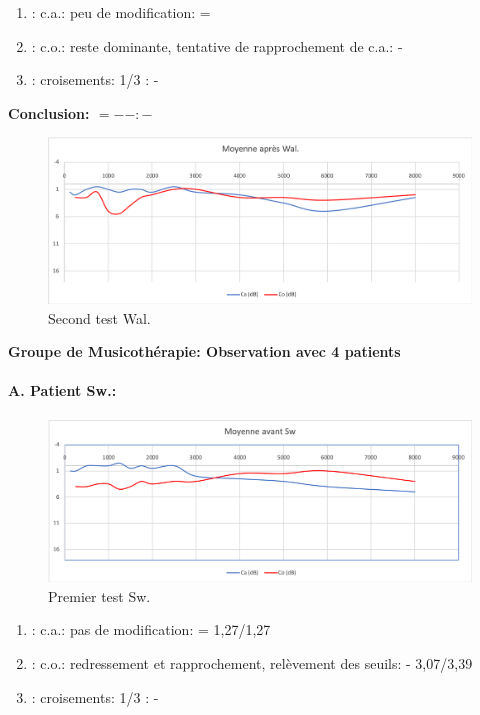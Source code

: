 	\begin{enumerate}
 		
 		\item : c.a.: peu de modification: =
                
 		\item : c.o.: reste dominante, tentative de rapprochement de c.a.: -
 		\item : croisements: 1/3 :  -
                  
                \end{enumerate}

                \textbf{ Conclusion:  $= -  -        : -$ }

               \begin{figure}
\centering
\includegraphics[width=0.7\linewidth]{images/graphiques/wal_post.png}
\caption[Moyenne OG+OD]{Second test Wal.}
       
\label{groupecontroleimage1}
\end{figure}
                
  \textbf{ Groupe de Musicothérapie: Observation avec 4 patients}

\paragraph{ A. Patient Sw.:}



 \begin{figure}
\centering
\includegraphics[width=0.7\linewidth]{images/graphiques/sw_pre.png}
\caption[Moyenne OG+OD]{Premier test Sw.}
       
\label{groupecontroleimage1}
\end{figure}

	\begin{enumerate}
 		
 		\item : c.a.: pas de modification: =   1,27/1,27
                
 		\item : c.o.: redressement et rapprochement,
                  relèvement des seuils: -         3,07/3,39
 		\item : croisements: 1/3 :  -
                  
                \end{enumerate}

